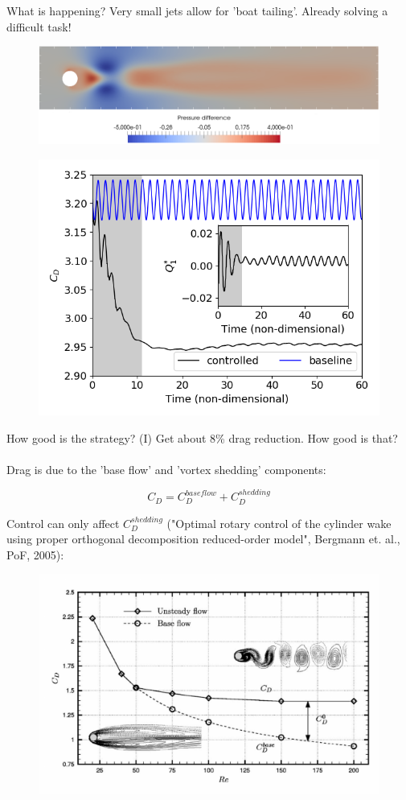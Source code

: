 \documentclass{beamer}
\begin{document}
\begin{frame}{What is happening?}
    Very small jets allow for 'boat tailing'. Already solving a difficult task!

    \begin{figure}
    \begin{center}
      \includegraphics[width=.70\textwidth]{Figures/pressure_difference}
    \end{center}
    \end{figure}

    \begin{figure}
    \begin{center}
      \includegraphics[width=.51\textwidth]{Figures/drag_and_jets}
    \end{center}
    \end{figure}
\end{frame}

\begin{frame}{How good is the strategy? (I)}
    Get about 8\% drag reduction. How good is that? \\~\\
    
    Drag is due to the 'base flow' and 'vortex shedding' components:
    
    $$C_D = C_D^{base flow} + C_D^{shedding}$$
    
    Control can only affect $C_D^{shedding}$ ("Optimal rotary control of the cylinder wake using proper orthogonal decomposition reduced-order model", Bergmann et. al., PoF, 2005):
    
    \begin{figure}
    \begin{center}
      \includegraphics[width=.51\textwidth]{Figures/illustration_Cordier}
    \end{center}
    \end{figure}
\end{frame}
\end{document}
